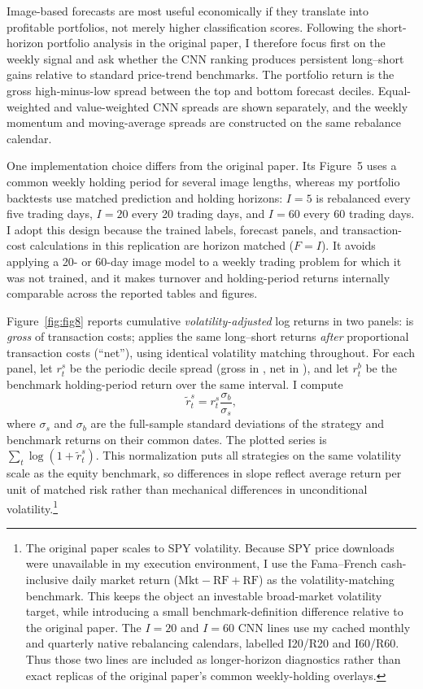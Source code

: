 \documentclass{article}
\begin{document}
Image-based forecasts are most useful economically if they translate into
profitable portfolios, not merely higher classification scores. Following the
short-horizon portfolio analysis in the original paper, I therefore focus first
on the weekly signal and ask whether the CNN ranking produces persistent
long--short gains relative to standard price-trend benchmarks. The portfolio
return is the gross high-minus-low spread between the top and bottom forecast
deciles. Equal-weighted and value-weighted CNN spreads are shown separately,
and the weekly momentum and moving-average spreads are constructed on the same
rebalance calendar.

One implementation choice differs from the original paper. Its Figure~5 uses a
common weekly holding period for several image lengths, whereas my portfolio
backtests use matched prediction and holding horizons: $I=5$ is rebalanced every
five trading days, $I=20$ every 20 trading days, and $I=60$ every 60 trading
days. I adopt this design because the trained labels, forecast panels, and
transaction-cost calculations in this replication are horizon matched
($F=I$). It avoids applying a 20- or 60-day image model to a weekly trading
problem for which it was not trained, and it makes turnover and holding-period
returns internally comparable across the reported tables and figures.

Figure~\ref{fig:fig8} reports cumulative \emph{volatility-adjusted} log
returns in two panels:  is \emph{gross} of transaction costs;
 applies the same long--short returns \emph{after} proportional
transaction costs (``net''), using identical volatility matching throughout. For
each panel, let $r_t^{s}$ be the periodic decile spread (gross in
, net in ), and let $r_t^{b}$ be the
benchmark holding-period return over the same interval. I compute
\[
  \tilde r_t^{s}
  =
  r_t^{s}
  \frac{\sigma_b}{\sigma_s},
\]
where $\sigma_s$ and $\sigma_b$ are the full-sample standard deviations of the
strategy and benchmark returns on their common dates. The plotted series is
$\sum_t \log(1+\tilde r_t^{s})$. This normalization puts all strategies on the
same volatility scale as the equity benchmark, so differences in slope reflect
average return per unit of matched risk rather than mechanical differences in
unconditional volatility.\footnote{The original paper scales to SPY volatility.
Because SPY price downloads were unavailable in my execution environment, I
use the Fama--French cash-inclusive daily market return
($\mathrm{Mkt{-}RF}+\mathrm{RF}$) as the volatility-matching benchmark. This
keeps the object an investable broad-market volatility target, while introducing
a small benchmark-definition difference relative to the original paper. The
$I=20$ and $I=60$ CNN lines use my cached monthly and quarterly native
rebalancing calendars, labelled I20/R20 and I60/R60. Thus those two lines are
included as longer-horizon diagnostics rather than exact replicas of the
original paper's common weekly-holding overlays.}
\end{document}
